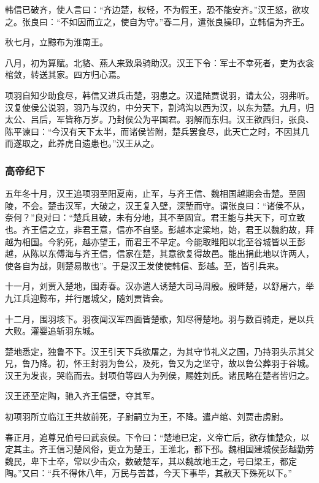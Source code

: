 \documentclass[]{article}
\begin{document}
韩信已破齐，使人言曰：``齐边楚，权轻，不为假王，恐不能安齐。''汉王怒，欲攻之。张良曰：``不如因而立之，使自为守。''春二月，遣张良操印，立韩信为齐王。

秋七月，立黥布为淮南王。

八月，初为算赋。北貉、燕人来致枭骑助汉。汉王下令：军士不幸死者，吏为衣衾棺敛，转送其家。四方归心焉。

项羽自知少助食尽，韩信又进兵击楚，羽患之。汉遣陆贾说羽，请太公，羽弗听。汉复使侯公说羽，羽乃与汉约，中分天下，割鸿沟以西为汉，以东为楚。九月，归太公、吕后，军皆称万岁。乃封侯公为平国君。羽解而东归。汉王欲西归，张良、陈平谏曰：``今汉有天下太半，而诸侯皆附，楚兵罢食尽，此天亡之时，不因其几而遂取之，此养虎自遗患也。''汉王从之。

\hypertarget{header-n82}{%
\subsubsection{高帝纪下}\label{header-n82}}

五年冬十月，汉王追项羽至阳夏南，止军，与齐王信、魏相国越期会击楚。至固陵，不会。楚击汉军，大破之，汉王复入壁，深堑而守。谓张良曰：``诸侯不从，奈何？''良对曰：``楚兵且破，未有分地，其不至固宜。君王能与共天下，可立致也。齐王信之立，非君王意，信亦不自坚。彭越本定梁地，始，君王以魏豹故，拜越为相国。今豹死，越亦望王，而君王不早定。今能取睢阳以北至谷城皆以王彭越，从陈以东傅海与齐王信，信家在楚，其意欲复得故邑。能出捐此地以许两人，使各自为战，则楚易散也''。于是汉王发使使韩信、彭越。至，皆引兵来。

十一月，刘贾入楚地，围寿春。汉亦遣人诱楚大司马周殷。殷畔楚，以舒屠六，举九江兵迎黥布，并行屠城父，随刘贾皆会。

十二月，围羽垓下。羽夜闻汉军四面皆楚歌，知尽得楚地。羽与数百骑走，是以兵大败。灌婴追斩羽东城。

楚地悉定，独鲁不下。汉王引天下兵欲屠之，为其守节礼义之国，乃持羽头示其父兄，鲁乃降。初，怀王封羽为鲁公，及死，鲁又为之坚守，故以鲁公葬羽于谷城。汉王为发丧，哭临而去。封项伯等四人为列侯，赐姓刘氏。诸民略在楚者皆归之。

汉王还至定陶，驰入齐王信壁，夺其军。

初项羽所立临江王共敖前死，子尉嗣立为王，不降。遣卢绾、刘贾击虏尉。

春正月，追尊兄伯号曰武哀侯。下令曰：``楚地已定，义帝亡后，欲存恤楚众，以定其主。齐王信习楚风俗，更立为楚王，王淮北，都下邳。魏相国建城侯彭越勤劳魏民，卑下士卒，常以少击众，数破楚军，其以魏故地王之，号曰梁王，都定陶。''又曰：``兵不得休八年，万民与苦甚，今天下事毕，其赦天下殊死以下。''
\end{document}
